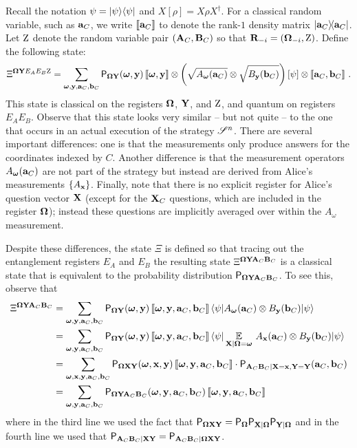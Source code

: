 Recall the notation $\psi = \ket{\psi}\bra{\psi}$ and $X[\rho]=X\rho X^\dagger$. For a classical random variable, such as $\ba_C$, we write $\puretomixed{\ba_C}$ to denote the rank-$1$ density matrix $\ketbra{\ba_C}{\ba_C}$. Let $\ac$ denote the random variable pair $(\bA_C, \bB_C)$ so that $\bR_\mi = (\bOmega_\mi,\ac)$. Define the following state:
\[
\Xi^{\bOmega \bY E_AE_B\ac} = \sum_{\bomega, \by, \ba_C, \bb_C} \P_{\bOmega \bY} (\bomega, \by) \, \puretomixed{\bomega, \by}   \otimes \left (\sqrt{A_{\bomega}(\ba_C)} \otimes \sqrt{B_{\by}(\bb_C)} \right ) \left [\psi \right ] \otimes \puretomixed{\ba_C, \bb_C}~.
\]
This state is classical on the registers $\bOmega$, $\bY$, and $\ac$, and quantum on registers $E_A E_B$. Observe that this state looks very similar -- but not quite -- to the one that occurs in an actual execution of the strategy $\strategy^n$. There are several important differences: one is that the measurements only produce answers for the coordinates indexed by $C$. Another difference is that the measurement operators $A_\bomega(\ba_C)$ are not part of the strategy but instead are derived from Alice's measurements $\{A_\bx\}$. Finally, note that there is no explicit register for Alice's question vector $\bX$ (except for the $\bX_C$ questions, which are included in the register $\bOmega$); instead these questions are implicitly averaged over within the $A_\omega$ measurement. 

Despite these differences, the state $\Xi$ is defined so that tracing out the entanglement registers $E_A$ and $E_B$ the resulting state $\Xi^{\bOmega \bY \bA_C \bB_C}$ is a classical state that is equivalent to the probability distribution $\P_{\bOmega \bY \bA_C \bB_C}$. To see this, observe that
\begin{align*}
\Xi^{\bOmega \bY \bA_C \bB_C} &= \sum_{\bomega, \by, \ba_C, \bb_C} \P_{\bOmega \bY}(\bomega, \by) \, \puretomixed{\bomega, \by, \ba_C, \bb_C} \, \bra{\psi} A_\bomega(\ba_C) \otimes B_\by(\bb_C) \ket{\psi} \\
&= \sum_{\bomega, \by, \ba_C, \bb_C} \P_{\bOmega \bY}(\bomega, \by) \, \puretomixed{\bomega, \by, \ba_C, \bb_C} \, \bra{\psi} \Ex_{\bX | \bOmega = \bomega} \, A_\bx(\ba_C)  \otimes B_\by(\bb_C) \ket{\psi} \\
&= \sum_{\bomega, \bx, \by, \ba_C, \bb_C} \P_{\bOmega \bX \bY}(\bomega, \bx, \by) \, \puretomixed{\bomega, \by, \ba_C, \bb_C} \cdot \P_{\bA_C \bB_C | \bX = \bx, \bY = \bY}(\ba_C,\bb_C) \\
&= \sum_{\bomega,\by, \ba_C, \bb_C} \P_{\bOmega\bY \bA_C \bB_C}(\bomega, \by, \ba_C,\bb_C) \, \puretomixed{\bomega, \by, \ba_C, \bb_C}
\end{align*}
where in the third line we used the fact that $\P_{\bOmega \bX \bY} = \P_{\bOmega} \P_{\bX | \bOmega} \P_{\bY | \bOmega}$ and in the fourth line we used that $\P_{\bA_C \bB_C | \bX \bY} = \P_{\bA_C \bB_C | \bOmega \bX \bY}$. 

